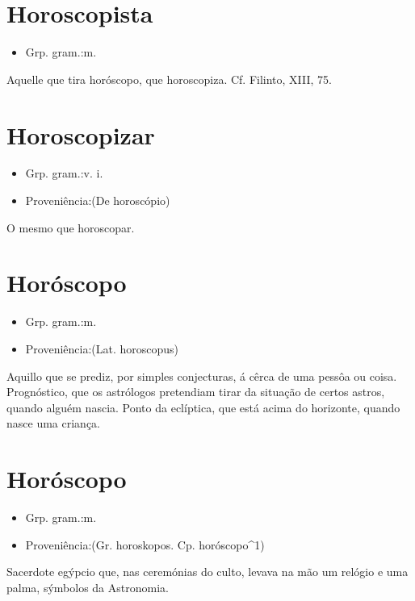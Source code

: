 \documentclass{article}
\begin{document}
\section{Horoscopista}
\begin{itemize}
\item {Grp. gram.:m.}
\end{itemize}
Aquelle que tira horóscopo, que horoscopiza. Cf. Filinto, XIII, 75.
\section{Horoscopizar}
\begin{itemize}
\item {Grp. gram.:v. i.}
\end{itemize}
\begin{itemize}
\item {Proveniência:(De \textunderscore horoscópio\textunderscore )}
\end{itemize}
O mesmo que \textunderscore horoscopar\textunderscore .
\section{Horóscopo}
\begin{itemize}
\item {Grp. gram.:m.}
\end{itemize}
\begin{itemize}
\item {Proveniência:(Lat. \textunderscore horoscopus\textunderscore )}
\end{itemize}
Aquillo que se prediz, por simples conjecturas, á cêrca de uma pessôa ou coisa.
Prognóstico, que os astrólogos pretendiam tirar da situação de certos astros, quando alguém nascia.
Ponto da eclíptica, que está acima do horizonte, quando nasce uma criança.
\section{Horóscopo}
\begin{itemize}
\item {Grp. gram.:m.}
\end{itemize}
\begin{itemize}
\item {Proveniência:(Gr. \textunderscore horoskopos\textunderscore . Cp. \textunderscore horóscopo\textunderscore ^1)}
\end{itemize}
Sacerdote egýpcio que, nas ceremónias do culto, levava na mão um relógio e uma palma, sýmbolos da Astronomia.
\end{document}
